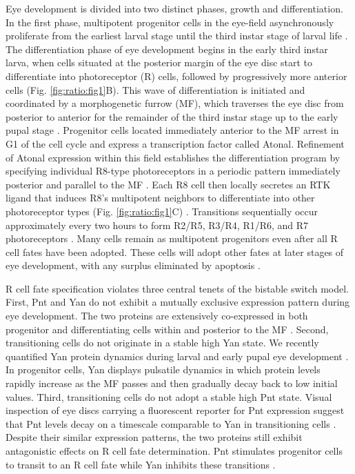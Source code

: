 Eye development is divided into two distinct phases, growth and differentiation. In the first phase, multipotent progenitor cells in the eye-field asynchronously proliferate from the earliest larval stage until the third instar stage of larval life \cite{Wolff1993}. The differentiation phase of eye development begins in the early third instar larva, when cells situated at the posterior margin of the eye disc start to differentiate into photoreceptor (R) cells, followed by progressively more anterior cells (Fig. \ref{fig:ratio:fig1}B). This wave of differentiation is initiated and coordinated by a morphogenetic furrow (MF), which traverses the eye disc from posterior to anterior for the remainder of the third instar stage up to the early pupal stage \cite{Voas2004}. Progenitor cells located immediately anterior to the MF arrest in G1 of the cell cycle and express a transcription factor called Atonal. Refinement of Atonal expression within this field establishes the differentiation program by specifying individual R8-type photoreceptors in a periodic pattern immediately posterior and parallel to the MF \cite{Jarman1994,Zhang2006}. Each R8 cell then locally secretes an RTK ligand that induces R8's multipotent neighbors to differentiate into other photoreceptor types (Fig. \ref{fig:ratio:fig1}C) \cite{Freeman1996,Voas2004}. Transitions sequentially occur approximately every two hours to form R2/R5, R3/R4, R1/R6, and R7 photoreceptors \cite{Wolff1993}. Many cells remain as multipotent progenitors even after all R cell fates have been adopted. These cells will adopt other fates at later stages of eye development, with any surplus eliminated by apoptosis \cite{Wolff1991}.

R cell fate specification violates three central tenets of the bistable switch model. First, Pnt and Yan do not exhibit a mutually exclusive expression pattern during eye development. The two proteins are extensively co-expressed in both progenitor and differentiating cells within and posterior to the MF \cite{BoisclairLachance2014}. Second, transitioning cells do not originate in a stable high Yan state. We recently quantified Yan protein dynamics during larval and early pupal eye development \cite{Pelaez2015a}. In progenitor cells, Yan displays pulsatile dynamics in which protein levels rapidly increase as the MF passes and then gradually decay back to low initial values. Third, transitioning cells do not adopt a stable high Pnt state. Visual inspection of eye discs carrying a fluorescent reporter for Pnt expression suggest that Pnt levels decay on a timescale comparable to Yan in transitioning cells \cite{BoisclairLachance2014}. Despite their similar expression patterns, the two proteins still exhibit antagonistic effects on R cell fate determination. Pnt stimulates progenitor cells to transit to an R cell fate while Yan inhibits these transitions \cite{ONeill1994a,Rebay1995}.

